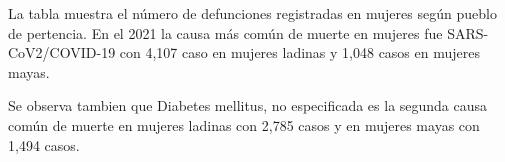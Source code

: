 La tabla muestra el número de defunciones registradas en mujeres según pueblo de pertencia. En el 2021 la causa más común de muerte en mujeres fue SARS-CoV2/COVID-19 con 4,107 caso en mujeres ladinas y 1,048 casos en mujeres mayas. 

Se observa tambien que Diabetes mellitus, no especificada es la segunda causa común de muerte en mujeres ladinas con 2,785 casos y en mujeres mayas con 1,494 casos. 